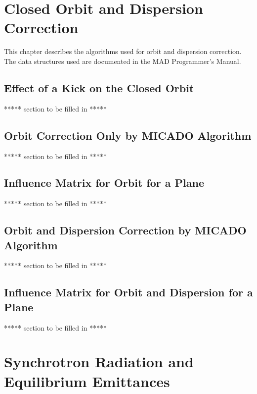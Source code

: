  
 
\chapter{Closed Orbit and Dispersion Correction}
This chapter describes the algorithms used for orbit and dispersion
correction.
The data structures used are documented in the MAD Programmer's Manual.
 
 
\section{Effect of a Kick on the Closed Orbit}
\label{kick}
***** section to be filled in *****
 
 
\section{Orbit Correction Only by MICADO Algorithm}
***** section to be filled in *****
 
 
\section{Influence Matrix for Orbit for a Plane}
***** section to be filled in *****
 
 
\section{Orbit and Dispersion Correction by MICADO Algorithm}
***** section to be filled in *****
 
 
\section{Influence Matrix for Orbit and Dispersion for a Plane}
***** section to be filled in *****
 
 
 
\chapter{Synchrotron Radiation and Equilibrium Emittances}
\label{synchro}
 
